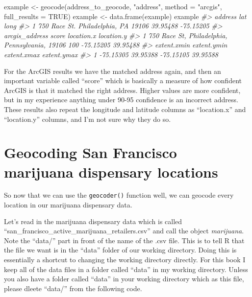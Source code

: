\documentclass[
]{krantz}
\makeatletter
\newenvironment{Shaded}{\begin{snugshade}}{\end{snugshade}}
\newcommand{\AttributeTok}[1]{\textcolor[rgb]{0.61,0.61,0.61}{#1}}
\newcommand{\CommentTok}[1]{\textcolor[rgb]{0.37,0.37,0.37}{\textit{#1}}}
\newcommand{\ConstantTok}[1]{\textcolor[rgb]{0,0,0}{#1}}
\newcommand{\FunctionTok}[1]{\textcolor[rgb]{0,0,0}{#1}}
\newcommand{\NormalTok}[1]{#1}
\newcommand{\OtherTok}[1]{\textcolor[rgb]{0.37,0.37,0.37}{#1}}
\newcommand{\StringTok}[1]{\textcolor[rgb]{0.5,0.5,0.5}{#1}}
\newenvironment{kframe}{%
\medskip{}
\setlength{\fboxsep}{.8em}
 \def\at@end@of@kframe{}%
 \ifinner\ifhmode%
  \def\at@end@of@kframe{\end{minipage}}%
  \begin{minipage}{\columnwidth}%
 \fi\fi%
 \def\FrameCommand##1{\hskip\@totalleftmargin \hskip-\fboxsep
 \colorbox{shadecolor}{##1}\hskip-\fboxsep
     \hskip-\linewidth \hskip-\@totalleftmargin \hskip\columnwidth}%
 \MakeFramed {\advance\hsize-\width
   \@totalleftmargin\z@ \linewidth\hsize
   \@setminipage}}%
 {\par\unskip\endMakeFramed%
 \at@end@of@kframe}
\renewenvironment{Shaded}{\begin{kframe}}{\end{kframe}}
\makeatother
\begin{document}
\begin{Shaded}
\begin{Highlighting}[]
\NormalTok{example }\OtherTok{\textless{}{-}} \FunctionTok{geocode}\NormalTok{(address\_to\_geocode, }\StringTok{"address"}\NormalTok{, }
                   \AttributeTok{method =} \StringTok{"arcgis"}\NormalTok{, }\AttributeTok{full\_results =} \ConstantTok{TRUE}\NormalTok{)}
\NormalTok{example }\OtherTok{\textless{}{-}} \FunctionTok{data.frame}\NormalTok{(example)}
\NormalTok{example}
\CommentTok{\#\textgreater{}                               address      lat      long}
\CommentTok{\#\textgreater{} 1 750 Race St. Philadelphia, PA 19106 39.95488 {-}75.15205}
\CommentTok{\#\textgreater{}                                   arcgis\_address score location.x location.y}
\CommentTok{\#\textgreater{} 1 750 Race St, Philadelphia, Pennsylvania, 19106   100  {-}75.15205   39.95488}
\CommentTok{\#\textgreater{}   extent.xmin extent.ymin extent.xmax extent.ymax}
\CommentTok{\#\textgreater{} 1   {-}75.15305    39.95388   {-}75.15105    39.95588}
\end{Highlighting}
\end{Shaded}

For the ArcGIS results we have the matched address again, and then an important variable called ``score'' which is basically a measure of how confident ArcGIS is that it matched the right address. Higher values are more confident, but in my experience anything under 90-95 confidence is an incorrect address. These results also repeat the longitude and latitude columns as ``location.x'' and ``location.y'' columns, and I'm not sure why they do so.

\hypertarget{geocoding-san-francisco-marijuana-dispensary-locations}{%
\section{Geocoding San Francisco marijuana dispensary locations}\label{geocoding-san-francisco-marijuana-dispensary-locations}}

So now that we can use the \texttt{geocoder()} function well, we can geocode every location in our marijuana dispensary data.

Let's read in the marijuana dispensary data which is called ``san\_francisco\_active\_marijuana\_retailers.csv'' and call the object \emph{marijuana}. Note the ``data/'' part in front of the name of the .csv file. This is to tell R that the file we want is in the ``data'' folder of our working directory. Doing this is essentially a shortcut to changing the working directory directly. For this book I keep all of the data files in a folder called ``data'' in my working directory. Unless you also have a folder called ``data'' in your working directory which as this file, please dleete ``data/'' from the following code.
\end{document}
